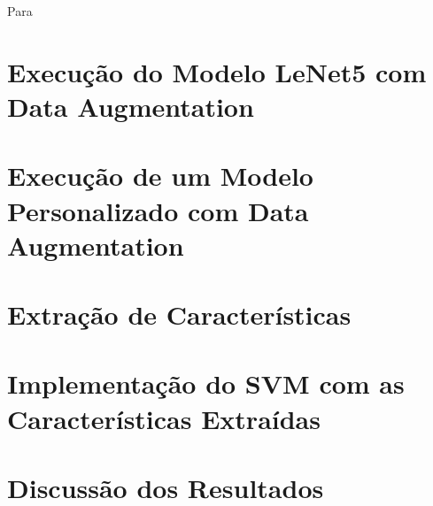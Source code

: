 \documentclass[12pt]{article}
\begin{document}
Para

\section{Execução do Modelo LeNet5 com Data Augmentation}
\section{Execução de um Modelo Personalizado com Data Augmentation}
\section{Extração de Características}
\section{Implementação do SVM com as Características Extraídas}
\section{Discussão dos Resultados}
\end{document}
